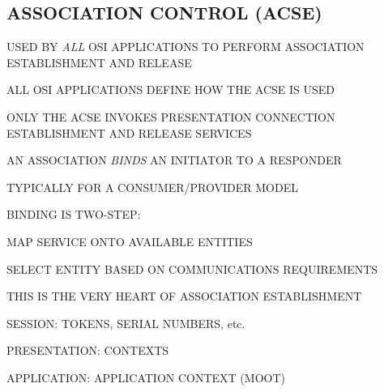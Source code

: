 \begin{bwslide}
\part*	{ASSOCIATION CONTROL (ACSE)}\bf

\begin{nrtc}
\item	USED BY \emph{ALL} OSI APPLICATIONS TO PERFORM ASSOCIATION
	ESTABLISHMENT AND RELEASE

\item	ALL OSI APPLICATIONS DEFINE HOW THE ACSE IS USED

\item	ONLY THE ACSE INVOKES PRESENTATION CONNECTION ESTABLISHMENT AND
	RELEASE SERVICES
\end{nrtc}
\end{bwslide}


\begin{bwslide}

\begin{nrtc}
\item	AN ASSOCIATION \emph{BINDS} AN INITIATOR TO A RESPONDER
    \begin{nrtc}
    \item	TYPICALLY FOR A CONSUMER/PROVIDER MODEL
    \end{nrtc}

\item	BINDING IS TWO-STEP:
    \begin{nrtc}
    \item	MAP SERVICE ONTO AVAILABLE ENTITIES

    \item	SELECT ENTITY BASED ON COMMUNICATIONS REQUIREMENTS
    \end{nrtc}
\end{nrtc}
\end{bwslide}


\begin{bwslide}

\begin{nrtc}
\item	THIS IS THE VERY HEART OF ASSOCIATION ESTABLISHMENT
    \begin{nrtc}
    \item	SESSION: TOKENS, SERIAL NUMBERS, etc.

    \item	PRESENTATION: CONTEXTS

    \item	APPLICATION: APPLICATION CONTEXT (MOOT)
    \end{nrtc}
\end{nrtc}
\end{bwslide}


